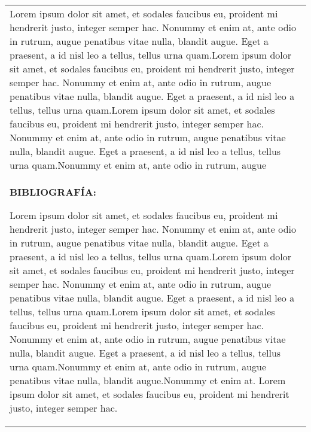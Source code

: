 \documentclass[10pt]{article}
\begin{document}
\begin{table}[H]
\begin{tabular}{|p{}|}
    Lorem ipsum dolor sit amet, et sodales faucibus eu, proident mi hendrerit justo, integer semper hac. Nonummy et enim at, ante odio in rutrum, augue penatibus vitae nulla, blandit augue. Eget a praesent, a id nisl leo a tellus, tellus urna quam.Lorem ipsum dolor sit amet, et sodales faucibus eu, proident mi hendrerit justo, integer semper hac. Nonummy et enim at, ante odio in rutrum, augue penatibus vitae nulla, blandit augue. Eget a praesent, a id nisl leo a tellus, tellus urna quam.Lorem ipsum dolor sit amet, et sodales faucibus eu, proident mi hendrerit justo, integer semper hac. Nonummy et enim at, ante odio in rutrum, augue penatibus vitae nulla, blandit augue. Eget a praesent, a id nisl leo a tellus, tellus urna quam.Nonummy et enim at, ante odio in rutrum, augue \\ 

    \textbf{BIBLIOGRAFÍA:}

    Lorem ipsum dolor sit amet, et sodales faucibus eu, proident mi hendrerit justo, integer semper hac. Nonummy et enim at, ante odio in rutrum, augue penatibus vitae nulla, blandit augue. Eget a praesent, a id nisl leo a tellus, tellus urna quam.Lorem ipsum dolor sit amet, et sodales faucibus eu, proident mi hendrerit justo, integer semper hac. Nonummy et enim at, ante odio in rutrum, augue penatibus vitae nulla, blandit augue. Eget a praesent, a id nisl leo a tellus, tellus urna quam.Lorem ipsum dolor sit amet, et sodales faucibus eu, proident mi hendrerit justo, integer semper hac. Nonummy et enim at, ante odio in rutrum, augue penatibus vitae nulla, blandit augue. Eget a praesent, a id nisl leo a tellus, tellus urna quam.Nonummy et enim at, ante odio in rutrum, augue penatibus vitae nulla, blandit augue.Nonummy et enim at. Lorem ipsum dolor sit amet, et sodales faucibus eu, proident mi hendrerit justo, integer semper hac.\\ \hline
  \end{tabular}
\end{table}

\end{document}
